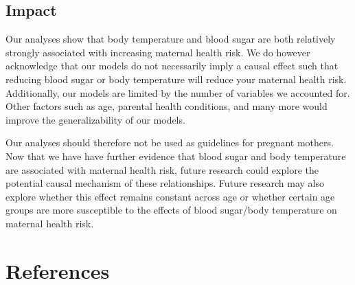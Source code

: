 \documentclass[
  letterpaper,
  DIV=11,
  numbers=noendperiod]{scrartcl}
\begin{document}
\subsection{Impact}\label{impact}

Our analyses show that body temperature and blood sugar are both
relatively strongly associated with increasing maternal health risk. We
do however acknowledge that our models do not necessarily imply a causal
effect such that reducing blood sugar or body temperature will reduce
your maternal health risk. Additionally, our models are limited by the
number of variables we accounted for. Other factors such as age,
parental health conditions, and many more would improve the
generalizability of our models.

Our analyses should therefore not be used as guidelines for pregnant
mothers. Now that we have have further evidence that blood sugar and
body temperature are associated with maternal health risk, future
research could explore the potential causal mechanism of these
relationships. Future research may also explore whether this effect
remains constant across age or whether certain age groups are more
susceptible to the effects of blood sugar/body temperature on maternal
health risk.

\section{References}\label{references}
\end{document}
